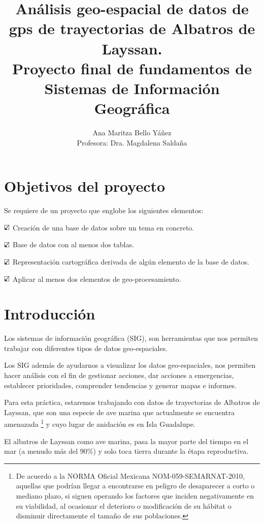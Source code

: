 \documentclass[a4paper, 11pt]{article}
\title{ Análisis geo-espacial de datos de gps de trayectorias de Albatros de
Layssan. \\
Proyecto final de fundamentos de Sistemas de Información Geográfica \\
}
\author{Ana Maritza Bello Yáñez \\ Profesora: Dra. Magdalena Saldaña}
\begin{document}
\maketitle
\tableofcontents

\section{Objetivos del proyecto}

Se requiere de un proyecto que englobe los siguientes elementos:

$\text{\rlap{$\checkmark$}}\square$ Creación de una base de datos sobre un tema
en concreto.

$\text{\rlap{$\checkmark$}}\square$ Base de datos con al menos dos tablas.

$\text{\rlap{$\checkmark$}}\square$ Representación cartográfica derivada de
algún elemento de la base de datos.

$\text{\rlap{$\checkmark$}}\square$ Aplicar al menos dos elementos de
geo-procesamiento.



\section{Introducción}

Los sistemas de información geográfica (SIG), son herramientas que nos permiten
trabajar con diferentes tipos de datos geo-espaciales.

Los SIG además de ayudarnos a visualizar los datos geo-espaciales, nos permiten
hacer análisis con el fin de gestionar acciones, dar acciones a emergencias,
establecer prioridades, comprender tendencias y generar mapas e informes.

Para esta práctica, estaremos trabajando con datos de trayectorias de Albatros
de Layssan, que son una especie de ave marina que actualmente se encuentra
amenazada \footnote{De acuerdo a la NORMA Oficial Mexicana
NOM-059-SEMARNAT-2010, aquellas que podrían llegar a encontrarse en peligro de
desaparecer a corto o mediano plazo, si siguen operando los factores que inciden
negativamente en su viabilidad, al ocasionar el deterioro o modificación de su
hábitat o disminuir directamente el tamaño de sus poblaciones.} y cuyo lugar de
anidación es en Isla Guadalupe.

El albatros de Layssan como ave marina, pasa la mayor parte del tiempo en el mar
(a menudo más del 90\%) y solo toca tierra durante la étapa reproductiva.
\end{document}
